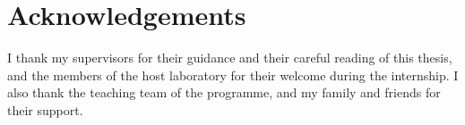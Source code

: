 \chapter*{Acknowledgements}


I thank my supervisors for their guidance and their careful reading of this
thesis, and the members of the host laboratory for their welcome during the
internship. I also thank the teaching team of the programme, and my family and
friends for their support.
